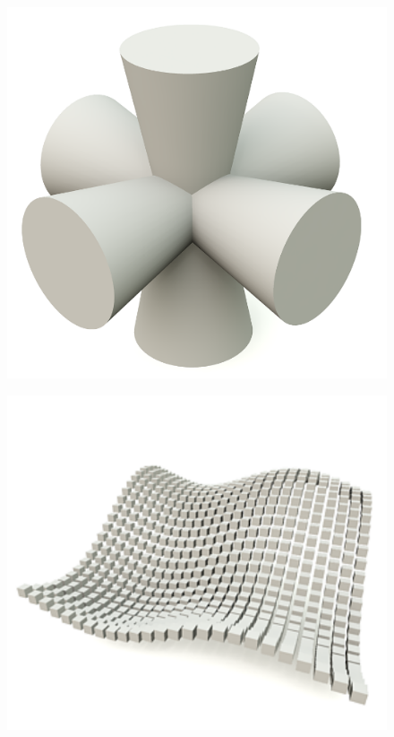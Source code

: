 \begin{figure}[h]
\centering
\begin{minipage}[t]{.33\textwidth}
  \centering
  \includegraphics[width=0.8\linewidth]{images/orto-cones}
  \label{fig:orto}
\end{minipage}%
\begin{minipage}[t]{.33\textwidth}
  \centering
  \includegraphics[width=.8\linewidth]{images/scriptecture}
  \label{fig:script}
\end{minipage}
\begin{minipage}[t]{.33\textwidth}
  \centering

\end{minipage}
\end{figure}
